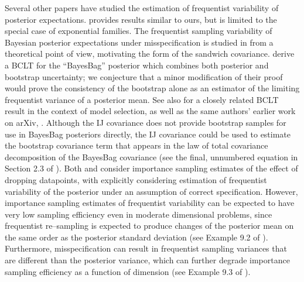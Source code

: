Several other papers have studied the estimation of frequentist variability of
posterior expectations.  \citet{efron:2015:frequentist} provides results similar
to ours, but is limited to the special case of exponential families. The
frequentist sampling variability of Bayesian posterior expectations under
misspecification is studied in \citet{kleijn:2012:bvm} from a theoretical point
of view, motivating the form of the sandwich covariance.
 derive a BCLT for the ``BayesBag''
posterior which combines both posterior and bootstrap uncertainty; we conjecture
that a minor modification of their proof would prove the consistency of the
bootstrap alone as an estimator of the limiting frequentist variance of a
posterior mean. See also \citet{huggins:2022:bayesbag} for a closely related
BCLT result in the context of model selection, as well as the same authors'
earlier work on arXiv, \citet{huggins:2020:bayesbag}.  Although the IJ
covariance does not provide bootstrap samples for use in BayesBag posteriors
directly, the IJ covariance could be used to estimate the bootstrap covariance
term that appears in the law of total covariance decomposition of the BayesBag
covariance (see the final, unnumbered equation in Section 2.3 of
\citet{huggins:2024:bayesbagparameter}). Both \citet{vehtari:2024:psis} and
\citet{lee:2017:frequentistbayesse} consider importance sampling estimates of
the effect of dropping datapoints, with \citet{lee:2017:frequentistbayesse}
explicitly considering estimation of frequentist variability of the posterior
under an assumption of correct specification. However, importance sampling
estimates of frequentist variability can be expected to have very low sampling
efficiency even in moderate dimensional problems, since frequentist re--sampling
is expected to produce changes of the posterior mean on the same order as the
posterior standard deviation (see Example 9.2 of \citet{owen:2014:mcbook}).
Furthermore, misspecification can result in frequentist sampling variances that
are different than the posterior variance, which can further degrade importance
sampling efficiency as a function of dimension (see Example 9.3 of
\citet{owen:2014:mcbook}).

